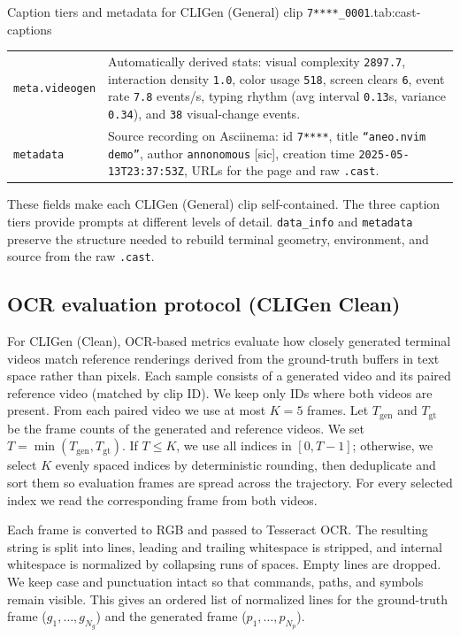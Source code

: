 \begin{smallschemetable}{Caption tiers and metadata for CLIGen (General) clip \texttt{7****\_0001}.}{tab:cast-captions}
\begin{tabularx}{\linewidth}{@{}l X@{}}
    \texttt{meta.videogen} &
      Automatically derived stats: visual complexity \texttt{2897.7}, interaction density \texttt{1.0}, color usage \texttt{518}, screen clears \texttt{6},
      event rate \texttt{7.8} events/s, typing rhythm (avg interval \texttt{0.13}s, variance \texttt{0.34}), and \texttt{38} visual-change events. \\
    \texttt{metadata} &
      Source recording on Asciinema: id \texttt{7****}, title \texttt{``aneo.nvim demo''}, author \texttt{annonomous} [sic], creation time \texttt{2025-05-13T23:37:53Z}, URLs for the page and raw \texttt{.cast}. \\
    \bottomrule
  \end{tabularx}
\end{smallschemetable}

These fields make each CLIGen (General) clip self-contained.
The three caption tiers provide prompts at different levels of detail.
\texttt{data\_info} and \texttt{metadata} preserve the structure needed to rebuild terminal geometry, environment, and source from the raw \texttt{.cast}. 

\subsection{OCR evaluation protocol (CLIGen Clean)}
For CLIGen (Clean), OCR-based metrics evaluate how closely generated terminal videos match reference renderings derived from the ground-truth buffers in text space rather than pixels.
Each sample consists of a generated video and its paired reference video (matched by clip ID).
We keep only IDs where both videos are present. 
% 
From each paired video we use at most $K{=}5$ frames.
Let $T_\text{gen}$ and $T_\text{gt}$ be the frame counts of the generated and reference videos.
We set $T=\min(T_\text{gen},T_\text{gt})$.
If $T \le K$, we use all indices in $[0, T{-}1]$; otherwise, we select $K$ evenly spaced indices by deterministic rounding, then deduplicate and sort them so evaluation frames are spread across the trajectory.
For every selected index we read the corresponding frame from both videos.

Each frame is converted to RGB and passed to Tesseract OCR.
The resulting string is split into lines, leading and trailing whitespace is stripped, and internal whitespace is normalized by collapsing runs of spaces.
Empty lines are dropped.
We keep case and punctuation intact so that commands, paths, and symbols remain visible.
This gives an ordered list of normalized lines for the ground-truth frame ($g_1,\dots,g_{N_g}$) and the generated frame ($p_1,\dots,p_{N_p}$).

